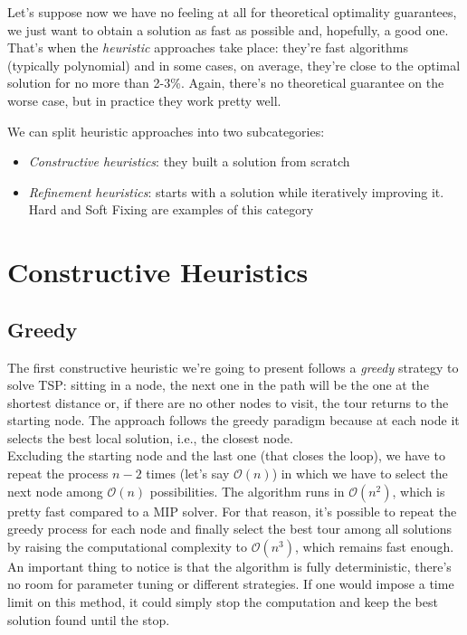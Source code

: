 Let's suppose now we have no feeling at all for theoretical optimality
guarantees, we just want to obtain a solution as fast as possible and,
hopefully, a good one. That's when the \emph{heuristic} approaches take place:
they're fast algorithms (typically polynomial) and in some cases, on average,
they're close to the optimal solution for no more than 2-3\%. Again, there's no
theoretical guarantee on the worse case, but in practice they work pretty well.

We can split heuristic approaches into two subcategories:
\begin{itemize}
    \item \emph{Constructive heuristics}: they built a solution from scratch
    \item \emph{Refinement heuristics}: starts with a solution while iteratively
        improving it. Hard and Soft Fixing are examples of this category
\end{itemize}

\section{Constructive Heuristics}

\subsection{Greedy}
The first constructive heuristic we're going to present follows a \emph{greedy}
strategy to solve TSP: sitting in a node, the next one in the path will be the
one at the shortest distance or, if there are no other nodes to visit, the tour
returns to the starting node. The approach follows the greedy paradigm
because at each node it selects the best local solution, i.e., the closest
node.\\
Excluding the starting node and the last one (that closes the loop), we have to
repeat the process $n -2$ times (let's say $\mathcal{O}(n)$) in which we have to
select the next node among $\mathcal{O}(n)$ possibilities. The algorithm runs in
$\mathcal{O}(n^2)$, which is pretty fast compared to a MIP solver. For that
reason, it's possible to repeat the greedy process for each node and finally
select the best tour among all solutions by raising the computational complexity 
to $\mathcal{O}(n^3)$, which remains fast enough.\\

An important thing to notice is that the algorithm is fully  deterministic,
there's no room for parameter tuning or different strategies. If one would
impose a time limit on this method, it could simply stop the computation and
keep the best solution found until the stop.

